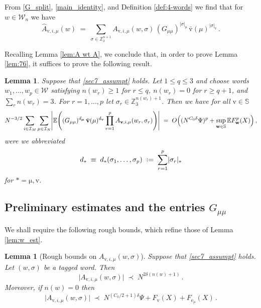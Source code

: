 \documentclass[11pt]{article} %
\numberwithin{equation}{section}
\numberwithin{figure}{section}
\theoremstyle{plain} %
\newtheorem{lemma}[theorem]{Lemma}
\theoremstyle{definition} %
\newcommand{\f}[1]{\boldsymbol{\mathrm{#1}}} %
\newcommand{\bb}{\mathbb} %
\renewcommand{\cal}{\mathcal}
\newcommand{\wh}{\widehat}
\newcommand{\E}{\mathbb{E}}
\newcommand{\Z}{\mathbb{Z}}
\newcommand*{\deq}{\mathrel{\vcenter{\baselineskip0.65ex \lineskiplimit0pt \hbox{.}\hbox{.}}}=}
\renewcommand{\leq}{\leqslant}
\renewcommand{\geq}{\geqslant}
\newcommand{\pB}[1]{\Bigl({#1}\Bigr)}
\newcommand{\pBB}[1]{\Biggl({#1}\Biggr)}
\newcommand{\abs}[1]{\lvert #1 \rvert}
\newcommand{\absBB}[1]{\Biggl\lvert #1 \Biggr\rvert}
\begin{document}
From \eqref{G_split}, \eqref{main_identity}, and Definition \ref{def:4-words} we find that for $w \in \cal W_n$ we have
\begin{equation} \label{wh_A_identity}
\wh A_{\f v,i,\mu}(w) \;=\; \sum_{\sigma \in \Z_3^{n+1}} A_{\f v,i,\mu}(w,\sigma) \, (G_{\mu\mu})^{\abs{\sigma}_{\f \mu}} \, \bar{\f v}(\mu)^{\abs{\sigma}_{\f v}}\,.
\end{equation}



Recalling Lemma \ref{lem:A wt A}, we conclude that, in order to prove Lemma \ref{lem:76}, it suffices to prove the following result.

\begin{lemma} \label{lem:82}
Suppose that \eqref{sec7_assumpt} holds. Let $1 \leq q \leq 3$ and choose words $w_1, \dots, w_p \in \cal W$ satisfying $n(w_r) \geq 1$ for $r \leq q$, $n(w_r) = 0$ for  $r \geq q + 1$, and $\sum_r n(w_r) = 3$. For $r = 1, \dots, p$ let $\sigma_r \in \Z_3^{n(w_r) + 1}$.
Then we have for all $\f v \in \bb S$
\begin{equation} \label{sec8 2}
N^{-3/2} \sum_{i \in \cal I_M} \sum_{\mu \in \cal I_N} \absBB{\E \pBB{(G_{\mu\mu})^{d_{\f \mu}} \, \bar{\f v}(\mu)^{d_{\f v}} \prod_{r = 1}^{p} A_{\f v,i, \mu}(w_r, \sigma_r)}} \;=\; O \pB{(N^{C_0 \delta}\Psi)^p+\sup_{\f w \in \bb S}\E F^p_{\f w}(X)}\,,
\end{equation}
were we abbreviated
\begin{equation} \label{def_d_star}
d_* \;\equiv\; d_*(\sigma_1, \dots, \sigma_p) \;\deq\; \sum_{r = 1}^p \abs{\sigma_r}_*
\end{equation}
for $* = \f \mu, \f v$.
\end{lemma}

\subsection{Preliminary estimates and the entries $G_{\mu \mu}$}
We shall require the following rough bounds, which refine those of Lemma \ref{lem:w_est}.

\begin{lemma}[Rough bounds on $A_{\f v,i,\mu}(w,\sigma)$] \label{lem:whA_rough2}
Suppose that \eqref{sec7_assumpt} holds. Let $(w,\sigma)$ be a tagged word. Then
\begin{equation} \label{whA_rough3}
\abs{A_{\f v,i,\mu}(w,\sigma)} \;\prec\; N^{2 \delta (n(w) + 1)}\,.
\end{equation}
Moreover, if $n(w) = 0$ then
\begin{equation} \label{whA_rough4}
\abs{A_{\f v,i,\mu}(w,\sigma)} \;\prec\; N^{(C_0/2 + 1) \delta} \Psi + F_{\f v}(X) + F_{\f e_\mu}(X)\,.
\end{equation}
\end{lemma}
\end{document}
